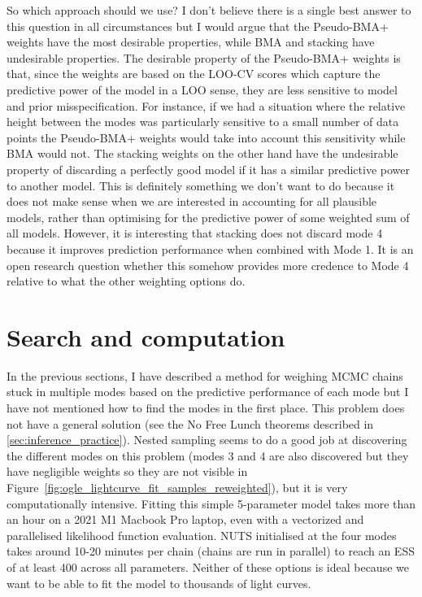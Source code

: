 \documentclass[12pt,dvipsnames]{report}
\begin{document}
So which approach should we use? I don't believe there is a single best answer 
to this question in all circumstances but I would argue that the Pseudo-BMA+ weights 
have the most desirable properties, while BMA and stacking have undesirable properties.
The desirable property of the Pseudo-BMA+ weights is that, since the weights are based 
on the LOO-CV scores which capture the predictive power of the model in a LOO sense, 
they are less sensitive to model and prior misspecification. For instance, if we 
had a situation where the relative height between the modes was 
particularly sensitive to a small number of data points the Pseudo-BMA+ weights 
would take into account this sensitivity while BMA would not.
The stacking weights on the other hand have the undesirable property of discarding
a perfectly good model if it has a similar predictive power to another model. This is 
definitely something we don't want to do because it does not make sense when we 
are interested in accounting for all plausible models, rather than optimising for 
the predictive power of some weighted sum of all models. However, it is interesting 
that stacking does not discard mode 4 because it improves prediction performance 
when combined with Mode 1. It is an open research question whether this somehow provides 
more credence to Mode 4 relative to what the other weighting options do.

\section{Search and computation}
\label{sec:search_and_computation}
In the previous sections, I have described a method for weighing MCMC chains stuck 
in multiple modes based on the predictive performance of each mode but I have not
mentioned how to find the modes in the first place. This problem does not have a general
solution (see the No Free Lunch theorems described in \ref{sec:inference_practice}). 
Nested sampling seems to do a good job at discovering the different modes on this 
problem (modes 3 and 4 are also discovered but they have negligible weights so they 
are not visible in Figure~\ref{fig:ogle_lightcurve_fit_samples_reweighted}), but it is 
very computationally intensive. Fitting this simple 5-parameter model takes more 
than an hour on a 2021 M1 Macbook Pro laptop, even with a vectorized and 
parallelised likelihood function evaluation. NUTS initialised at the four modes takes 
around 10-20 minutes per chain (chains are run in parallel) to reach an ESS of at least 
400 across all parameters. Neither of these options is ideal because we want to be able 
to fit the model to thousands of light curves.
\end{document}

